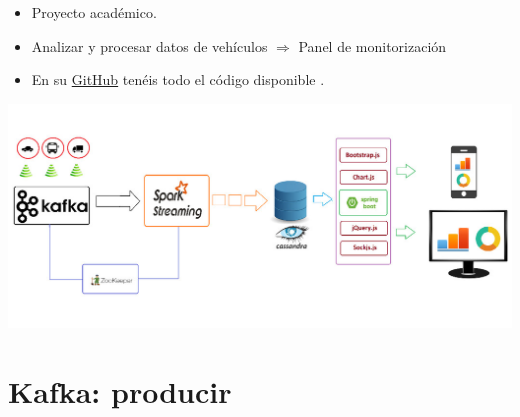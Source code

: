 \documentclass[dvipsnames]{beamer}
\begin{document}
        \begin{frame}
          \begin{itemize}
          \item Proyecto académico.
          \item Analizar y procesar datos de vehículos $\Rightarrow$ Panel de monitorización
          \item En su \href{https://github.com/baghelamit/iot-traffic-monitor}{\textcolor{deepBlue}{GitHub}} tenéis todo el código disponible \Winkey.
          \end{itemize}
        \end{frame}

        \begin{frame}
          \begin{center}
          \includegraphics[scale=0.3]{img/arquitectura.jpg}  
          \end{center}          
        \end{frame}

        \section{Kafka: producir}
	
\end{document}

